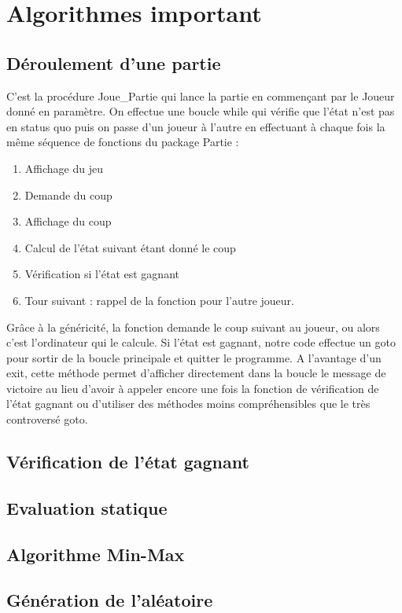 \documentclass[a4paper, 10pt, french]{article}
\begin{document}
\section{Algorithmes important}
{

    \subsection{Déroulement d'une partie}
    {
        C'est la procédure Joue_Partie qui lance la partie en commençant par le Joueur donné en paramètre. On effectue une boucle
        while qui vérifie que l'état n'est pas en status quo puis on passe d'un joueur à l'autre en effectuant à chaque fois
        la même séquence de fonctions du package Partie :
        \begin{enumerate}
            \item Affichage du jeu
            \item Demande du coup
            \item Affichage du coup
            \item Calcul de l'état suivant étant donné le coup
            \item Vérification si l'état est gagnant
            \item Tour suivant : rappel de la fonction pour l'autre joueur.
        \end{enumerate}
        Grâce à la généricité, la fonction demande le coup suivant au joueur, ou alors c'est l'ordinateur qui le calcule.
        Si l'état est gagnant, notre code effectue un goto pour sortir de la boucle principale et quitter le programme.
        A l'avantage d'un exit, cette méthode permet d'afficher directement dans la boucle le message de victoire au lieu
        d'avoir à appeler encore une fois la fonction de vérification de l'état gagnant ou d'utiliser des méthodes moins
        compréhensibles que le très controversé goto.
    }

    \subsection{Vérification de l'état gagnant}
    {
    }

    \subsection{Evaluation statique}
    {
    }

    \subsection{Algorithme Min-Max}
    {
    }

    \subsection{Génération de l'aléatoire}
    {
    }
}   
\end{document}
